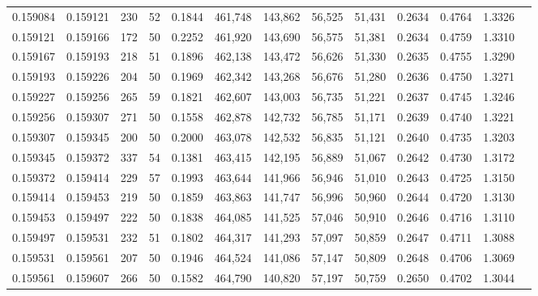 \begin{tabular}{rrrrrrrrrrrrr}
0.159084 & 0.159121 &   230 &  52 &                                     0.1844 & 461,748 & 143,862 &  56,525 &  51,431 & 0.2634 & 0.4764 & 1.3326 \\
0.159121 & 0.159166 &   172 &  50 &                                     0.2252 & 461,920 & 143,690 &  56,575 &  51,381 & 0.2634 & 0.4759 & 1.3310 \\
0.159167 & 0.159193 &   218 &  51 &                                     0.1896 & 462,138 & 143,472 &  56,626 &  51,330 & 0.2635 & 0.4755 & 1.3290 \\
0.159193 & 0.159226 &   204 &  50 &                                     0.1969 & 462,342 & 143,268 &  56,676 &  51,280 & 0.2636 & 0.4750 & 1.3271 \\
0.159227 & 0.159256 &   265 &  59 &                                     0.1821 & 462,607 & 143,003 &  56,735 &  51,221 & 0.2637 & 0.4745 & 1.3246 \\
0.159256 & 0.159307 &   271 &  50 &                                     0.1558 & 462,878 & 142,732 &  56,785 &  51,171 & 0.2639 & 0.4740 & 1.3221 \\
0.159307 & 0.159345 &   200 &  50 &                                     0.2000 & 463,078 & 142,532 &  56,835 &  51,121 & 0.2640 & 0.4735 & 1.3203 \\
0.159345 & 0.159372 &   337 &  54 &                                     0.1381 & 463,415 & 142,195 &  56,889 &  51,067 & 0.2642 & 0.4730 & 1.3172 \\
0.159372 & 0.159414 &   229 &  57 &                                     0.1993 & 463,644 & 141,966 &  56,946 &  51,010 & 0.2643 & 0.4725 & 1.3150 \\
0.159414 & 0.159453 &   219 &  50 &                                     0.1859 & 463,863 & 141,747 &  56,996 &  50,960 & 0.2644 & 0.4720 & 1.3130 \\
0.159453 & 0.159497 &   222 &  50 &                                     0.1838 & 464,085 & 141,525 &  57,046 &  50,910 & 0.2646 & 0.4716 & 1.3110 \\
0.159497 & 0.159531 &   232 &  51 &                                     0.1802 & 464,317 & 141,293 &  57,097 &  50,859 & 0.2647 & 0.4711 & 1.3088 \\
0.159531 & 0.159561 &   207 &  50 &                                     0.1946 & 464,524 & 141,086 &  57,147 &  50,809 & 0.2648 & 0.4706 & 1.3069 \\
0.159561 & 0.159607 &   266 &  50 &                                     0.1582 & 464,790 & 140,820 &  57,197 &  50,759 & 0.2650 & 0.4702 & 1.3044 \\

\end{tabular}
